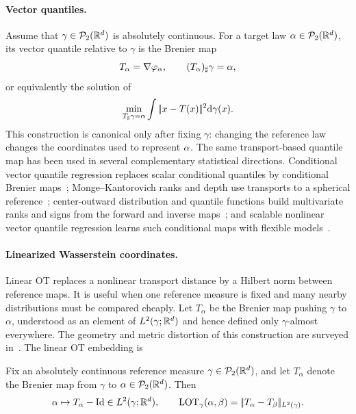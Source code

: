 \paragraph{Vector quantiles.}

	Assume that $\gamma\in\mathcal{P}_2(\mathbb{R}^d)$ is absolutely continuous. For a target law $\alpha\in\mathcal{P}_2(\mathbb{R}^d)$, its vector quantile relative to $\gamma$ is the Brenier map
\[
	T_\alpha=\nabla\varphi_\alpha,
	\qquad
	(T_\alpha)_\sharp\gamma=\alpha,
\]
or equivalently the solution of
\[
	\min_{T_\sharp\gamma=\alpha}
	\int |\!| x-T(x) |\!|^2\mathrm{d}\gamma(x).
\]
This construction is canonical only after fixing $\gamma$: changing the reference law changes the coordinates used to represent $\alpha$. The same transport-based quantile map has been used in several complementary statistical directions. Conditional vector quantile regression replaces scalar conditional quantiles by conditional Brenier maps~\cite{carlier2016vectorquantile,carlier2016vector}; Monge--Kantorovich ranks and depth use transports to a spherical reference~\cite{chernozhukov2017monge}; center-outward distribution and quantile functions build multivariate ranks and signs from the forward and inverse maps~\cite{hallin2021distribution}; and scalable nonlinear vector quantile regression learns such conditional maps with flexible models~\cite{rosenberg2023fast}.

\paragraph{Linearized Wasserstein coordinates.}

Linear OT replaces a nonlinear transport distance by a Hilbert norm between reference maps. It is useful when one reference measure is fixed and many nearby distributions must be compared cheaply. Let $T_\alpha$ be the Brenier map pushing $\gamma$ to $\alpha$, understood as an element of $L^2(\gamma;\mathbb{R}^d)$ and hence defined only $\gamma$-almost everywhere. The geometry and metric distortion of this construction are surveyed in~\cite{Merigot2026EmbeddingWasserstein}. The linear OT embedding is
\begin{defn}\label{def-lot-embedding}
Fix an absolutely continuous reference measure $\gamma\in\mathcal{P}_2(\mathbb{R}^d)$, and let $T_\alpha$ denote the Brenier map from $\gamma$ to $\alpha\in\mathcal{P}_2(\mathbb{R}^d)$. Then
\begin{equation}\label{eq-lot-embedding}
	\alpha \mapsto T_\alpha-\mathrm{Id}\in L^2(\gamma;\mathbb{R}^d),
	\qquad
	\operatorname{LOT}_\gamma(\alpha,\beta)=|\!| T_\alpha-T_\beta |\!|_{L^2(\gamma)}.
\end{equation}
\end{defn}

